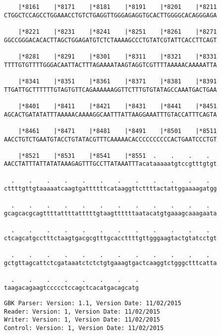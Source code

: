 \documentclass{article}
\begin{document}
\begin{Verbatim}
    |*8161    |*8171    |*8181    |*8191    |*8201    |*8211
CTGGCTCCAGCCTGGAAACCTGTCTGAGGTTGGGAGAGGTGCACTTGGGGCACAGGGAGA
  
    |*8221    |*8231    |*8241    |*8251    |*8261    |*8271
GGCCGGGACACACTTAGCTGGAGATGTCTCTAAAAGCCCTGTATCGTATTCACCTTCAGT
  
    |*8281    |*8291    |*8301    |*8311    |*8321    |*8331
TTTTGTGTTTTGGGACAATTACTTTAGAAAATAAGTAGGTCGTTTTAAAAACAAAAATTA
  
    |*8341    |*8351    |*8361    |*8371    |*8381    |*8391
TTGATTGCTTTTTTGTAGTGTTCAGAAAAAAGGTTCTTTGTGTATAGCCAAATGACTGAA
  
    |*8401    |*8411    |*8421    |*8431    |*8441    |*8451
AGCACTGATATATTTAAAAACAAAAGGCAATTTATTAAGGAAATTTGTACCATTTCAGTA
  
    |*8461    |*8471    |*8481    |*8491    |*8501    |*8511
AACCTGTCTGAATGTACCTGTATACGTTTCAAAAACACCCCCCCCCCACTGAATCCCTGT
  
    |*8521    |*8531    |*8541    |*8551  .    .    .    .  
AACCTATTTATTATATAAAGAGTTTGCCTTATAAATTTacataaaaatgtccgtttgtgt
  
  .    .    .    .    .    .    .    .    .    .    .    .  
cttttgttgtaaaaatcaagtgattttttcataaggttcttttactattggaaaagatgg
  
  .    .    .    .    .    .    .    .    .    .    .    .  
gcagcacgcagttttattttatttttgtaagttttttaatacatgtgaaagcaaagaata
  
  .    .    .    .    .    .    .    .    .    .    .    .  
ctcagcatgcctttctaagtgacgcgtttgcaccttttgttgggaagtactgtatcctgt
  
  .    .    .    .    .    .    .    .    .    .    .    .  
gctgttagcattctcgataaatctctctgtgaaagtgactcaaggtctgggctttcatta
  
  .    .    .    .    .    .    .    .
taagacagaagtccccctccagctcacatgacagcatg
\end{Verbatim}
\newpage
\begin{Verbatim}
GBK Parser: Version: 1.1, Version Date: 11/02/2015
Reader: Version: 1, Version Date: 11/02/2015
Writer: Version: 1, Version Date: 11/02/2015
Control: Version: 1, Version Date: 11/02/2015
\end{Verbatim}
\end{document}
